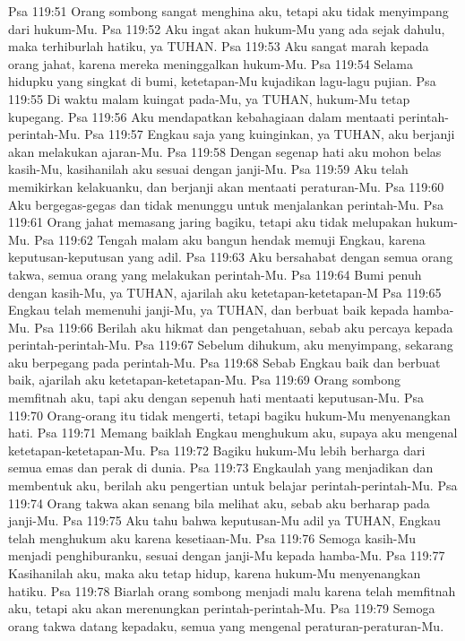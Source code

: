 Psa 119:51  Orang sombong sangat menghina aku, tetapi aku tidak menyimpang dari hukum-Mu.
Psa 119:52  Aku ingat akan hukum-Mu yang ada sejak dahulu, maka terhiburlah hatiku, ya TUHAN.
Psa 119:53  Aku sangat marah kepada orang jahat, karena mereka meninggalkan hukum-Mu.
Psa 119:54  Selama hidupku yang singkat di bumi, ketetapan-Mu kujadikan lagu-lagu pujian.
Psa 119:55  Di waktu malam kuingat pada-Mu, ya TUHAN, hukum-Mu tetap kupegang.
Psa 119:56  Aku mendapatkan kebahagiaan dalam mentaati perintah-perintah-Mu.
Psa 119:57  Engkau saja yang kuinginkan, ya TUHAN, aku berjanji akan melakukan ajaran-Mu.
Psa 119:58  Dengan segenap hati aku mohon belas kasih-Mu, kasihanilah aku sesuai dengan janji-Mu.
Psa 119:59  Aku telah memikirkan kelakuanku, dan berjanji akan mentaati peraturan-Mu.
Psa 119:60  Aku bergegas-gegas dan tidak menunggu untuk menjalankan perintah-Mu.
Psa 119:61  Orang jahat memasang jaring bagiku, tetapi aku tidak melupakan hukum-Mu.
Psa 119:62  Tengah malam aku bangun hendak memuji Engkau, karena keputusan-keputusan yang adil.
Psa 119:63  Aku bersahabat dengan semua orang takwa, semua orang yang melakukan perintah-Mu.
Psa 119:64  Bumi penuh dengan kasih-Mu, ya TUHAN, ajarilah aku ketetapan-ketetapan-M
Psa 119:65  Engkau telah memenuhi janji-Mu, ya TUHAN, dan berbuat baik kepada hamba-Mu.
Psa 119:66  Berilah aku hikmat dan pengetahuan, sebab aku percaya kepada perintah-perintah-Mu.
Psa 119:67  Sebelum dihukum, aku menyimpang, sekarang aku berpegang pada perintah-Mu.
Psa 119:68  Sebab Engkau baik dan berbuat baik, ajarilah aku ketetapan-ketetapan-Mu.
Psa 119:69  Orang sombong memfitnah aku, tapi aku dengan sepenuh hati mentaati keputusan-Mu.
Psa 119:70  Orang-orang itu tidak mengerti, tetapi bagiku hukum-Mu menyenangkan hati.
Psa 119:71  Memang baiklah Engkau menghukum aku, supaya aku mengenal ketetapan-ketetapan-Mu.
Psa 119:72  Bagiku hukum-Mu lebih berharga dari semua emas dan perak di dunia.
Psa 119:73  Engkaulah yang menjadikan dan membentuk aku, berilah aku pengertian untuk belajar perintah-perintah-Mu.
Psa 119:74  Orang takwa akan senang bila melihat aku, sebab aku berharap pada janji-Mu.
Psa 119:75  Aku tahu bahwa keputusan-Mu adil ya TUHAN, Engkau telah menghukum aku karena kesetiaan-Mu.
Psa 119:76  Semoga kasih-Mu menjadi penghiburanku, sesuai dengan janji-Mu kepada hamba-Mu.
Psa 119:77  Kasihanilah aku, maka aku tetap hidup, karena hukum-Mu menyenangkan hatiku.
Psa 119:78  Biarlah orang sombong menjadi malu karena telah memfitnah aku, tetapi aku akan merenungkan perintah-perintah-Mu.
Psa 119:79  Semoga orang takwa datang kepadaku, semua yang mengenal peraturan-peraturan-Mu.
